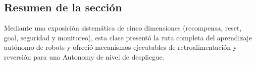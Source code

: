 \documentclass[a4paper]{article}
\begin{document}
\subsection{Resumen de la sección}
Mediante una exposición sistemática de cinco dimensiones (recompensa, reset, goal, seguridad y monitoreo), esta clase presentó la ruta completa del aprendizaje autónomo de robots y ofreció mecanismos ejecutables de retroalimentación y reversión para una Autonomy de nivel de despliegue.
\end{document}
